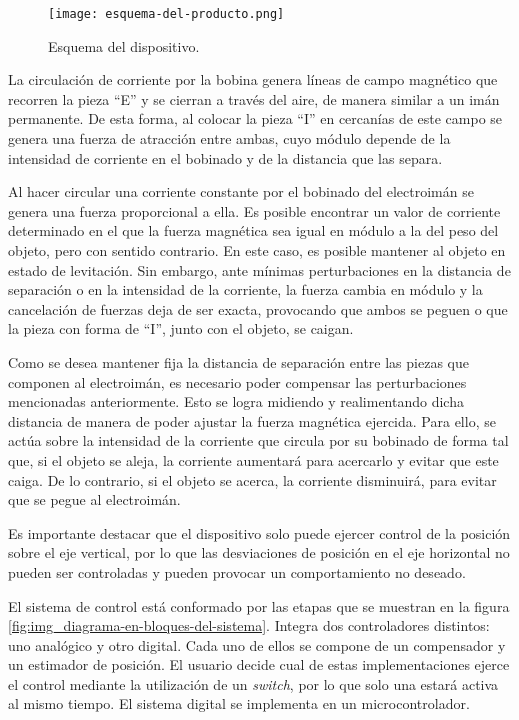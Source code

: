 \begin{figure}[H]
	\centering
	\texttt{[image: esquema-del-producto.png]}
	\caption{Esquema del dispositivo.}
	\label{fig:img_Esquema-del-producto}
\end{figure}

La circulación de corriente por la bobina genera líneas de campo magnético que recorren la pieza “E” y se cierran a través del aire, de manera similar a un imán permanente. De esta forma, al colocar la pieza “I” en cercanías de este campo se genera una fuerza de atracción entre ambas, cuyo módulo depende de la intensidad de corriente en el bobinado y de la distancia que las separa.

Al hacer circular una corriente constante por el bobinado del electroimán se genera una fuerza proporcional a ella. Es posible encontrar un valor de corriente determinado en el que la fuerza magnética sea igual en módulo a la del peso del objeto, pero con sentido contrario. En este caso, es posible mantener al objeto en estado de levitación. Sin embargo, ante mínimas perturbaciones en la distancia de separación o en la intensidad de la corriente,  la fuerza cambia en módulo y la cancelación de fuerzas deja de ser exacta, provocando que ambos se peguen o que la pieza con forma de “I”, junto con el objeto, se caigan. 

Como se desea mantener fija la distancia de separación entre las piezas que componen al electroimán, es necesario poder compensar las perturbaciones mencionadas anteriormente.   Esto se logra midiendo y realimentando dicha distancia de manera de poder ajustar la fuerza magnética ejercida. Para ello, se actúa sobre la intensidad de la corriente que circula por su bobinado de forma tal que, si el objeto se aleja, la corriente aumentará para acercarlo y evitar que este caiga. De lo contrario, si el objeto se acerca, la corriente disminuirá, para evitar que se pegue al electroimán. 

Es importante destacar que el dispositivo solo puede ejercer control de la posición sobre el eje vertical, por lo que las desviaciones de posición en el eje horizontal no pueden ser controladas y pueden provocar un comportamiento no deseado.

El sistema de control está conformado por las etapas que se muestran en la figura \ref{fig:img_diagrama-en-bloques-del-sistema}. Integra dos controladores distintos: uno analógico y otro digital. Cada uno de ellos se compone de un compensador y un estimador de posición. El usuario decide cual de estas implementaciones ejerce el control mediante la utilización de un \textsl{switch}, por lo que solo una estará activa al mismo tiempo. El sistema digital se implementa en un microcontrolador.

